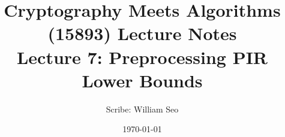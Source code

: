 \documentclass[11pt]{article}
\title{{\Large Cryptography Meets Algorithms (15893) Lecture Notes}\\[5pt]
{\bf Lecture 7: Preprocessing PIR Lower Bounds}}
\author{Scribe: William Seo}
\date{\today}
\begin{document}
\maketitle


{

}


\end{document}
